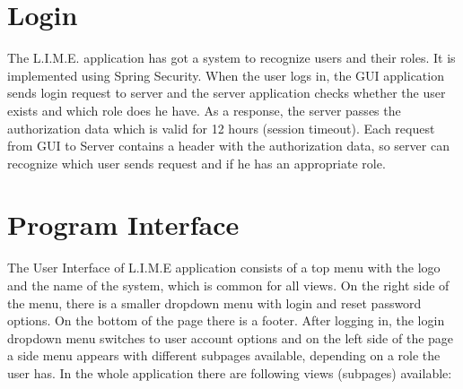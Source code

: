 \documentclass[a4paper,11pt,twoside]{report}
\theoremstyle{definition}
\begin{document}
\section{Login}
The L.I.M.E. application has got a system to recognize users and their roles. It is implemented using Spring Security. When the user logs in, the GUI application sends login request to server and the server application checks whether the user exists and which role does he have. As a response, the server passes the authorization data which is valid for 12 hours (session timeout). Each request from GUI to Server contains a header with the authorization data, so server can recognize which user sends request and if he has an appropriate role.
\section{Program Interface}

The User Interface of L.I.M.E application consists of a top menu with the logo and the name of the system, which is common for all views. On the right side of the menu, there is a smaller dropdown menu with login and reset password options. On the bottom of the page there is a footer. After logging in, the login dropdown menu switches to user account options and on the left side of the page a side menu appears with different subpages available, depending on a role the user has. In the whole application there are following views (subpages) available:
\end{document}
